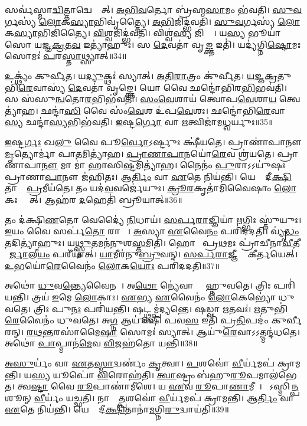 𑌸𑌰𑍍𑌵॑𑌸𑍍𑌮𑌾\ul{𑌦𑍍𑌵𑌿}𑌤𑍍𑌤𑌾𑌦𑍍𑌵𑍇𑌦𑍍𑌯𑌾᳚𑌤𑍍।
\ul{𑌅}\ul{𑌭𑌿}\ul{𑌵}𑌰𑍍𑌤𑍋 𑌬𑍍𑌰॑𑌹𑍍𑌮\ul{𑌸𑌾}𑌮𑌂 𑌭॑𑌵𑌤𑌿।
\ul{𑌸𑍁}\ul{𑌵}𑌰𑍍𑌗𑌸𑍍𑌯॑ \ul{𑌲𑍋}𑌕\ul{𑌸𑍍𑌯𑌾}𑌭𑌿𑌵𑍃॑𑌤𑍍𑌤𑍍𑌯𑍈।
\ul{𑌅}\ul{𑌭𑌿}𑌜𑌿𑌦𑍍𑌭॑𑌵𑌤𑌿।
\ul{𑌸𑍁}\ul{𑌵}𑌰𑍍𑌗𑌸𑍍𑌯॑ \ul{𑌲𑍋}𑌕\ul{𑌸𑍍𑌯𑌾}𑌭𑌿𑌜𑌿॑𑌤𑍍𑌯𑍈।
\ul{𑌵𑌿}\ul{𑌶𑍍𑌵}𑌜𑌿𑌦𑍍𑌭॑𑌵𑌤𑌿।
𑌵𑌿𑌶𑍍𑌵॑\ul{𑌸𑍍𑌯} 𑌜𑌿𑌤𑍍𑌯𑍈᳚।
𑌯\ul{𑌸𑍍𑌯} 𑌭𑍂𑌯𑌾॑𑌸𑍋 𑌯𑌜𑍍𑌞\ul{𑌕𑍍𑌰}𑌤\ul{𑌵} 𑌇𑌤𑍍𑌯𑌾॑𑌹𑍁𑌃।
𑌸 \ul{𑌦𑍇}𑌵𑌤𑌾॑ 𑌵𑍃\ul{𑌙𑍍𑌕𑍍𑌤} 𑌇𑌤𑌿॑।
𑌯𑌦𑍍𑌯॑𑌗𑍍𑌨𑌿\ul{𑌷𑍍𑌟𑍋}𑌮𑌃 𑌸𑍋𑌮𑌃॑ \ul{𑌪}𑌰\ul{𑌸𑍍𑌤𑌾}𑌥𑍍𑌸𑍍𑌯𑌾𑌤𑍍॥34॥

\ul{𑌉}𑌕𑍍𑌥𑍍𑌯𑌂॑ 𑌕𑍁𑌰𑍍𑌵𑍀𑌤।
𑌯\ul{𑌦𑍍𑌯𑍁}𑌕𑍍𑌥𑌃॑ 𑌸𑍍𑌯𑌾𑌤𑍍।
\ul{𑌅}\ul{𑌤𑌿}\ul{𑌰𑌾}𑌤𑍍𑌰𑌂 𑌕𑍁॑𑌰𑍍𑌵𑍀𑌤।
\ul{𑌯}\ul{𑌜𑍍𑌞}\ul{𑌕𑍍𑌰}𑌤𑍁𑌭𑌿॑\ul{𑌰𑍇}𑌵𑌾𑌸𑍍𑌯॑ \ul{𑌦𑍇}𑌵𑌤𑌾॑ 𑌵𑍃𑌙𑍍𑌕𑍍𑌤𑍇।
𑌯𑍋 𑌵𑍈 𑌛𑌨𑍍𑌦𑍋॑𑌭𑌿𑌰\ul{𑌭𑌿}𑌭𑌵॑𑌤𑌿।
𑌸 𑌸॑𑌸𑍁\ul{𑌨𑍍𑌵}𑌤𑍋\ul{𑌰}𑌭𑌿𑌭॑𑌵𑌤𑌿।
\ul{𑌸𑌂}\ul{𑌵𑍇}𑌶𑌾𑌯॑ 𑌤𑍍𑌵𑍋𑌪\ul{𑌵𑍇}𑌶𑌾\ul{𑌯} 𑌤𑍍𑌵𑍇𑌤𑍍𑌯𑌾॑𑌹।
𑌛𑌨𑍍𑌦𑌾॑\ul{𑌸𑌿} 𑌵𑍈 𑌸𑌂॑\ul{𑌵𑍇}𑌶 𑌉॑𑌪\ul{𑌵𑍇}𑌶𑌃।
𑌛𑌨𑍍𑌦𑍋॑𑌭𑌿\ul{𑌰𑍇}𑌵𑌾\ul{𑌸𑍍𑌯} 𑌛𑌨𑍍𑌦𑌾॑\ul{𑌸𑍍𑌯}𑌭𑌿𑌭॑𑌵𑌤𑌿।
\ul{𑌇}𑌷𑍍𑌟\ul{𑌰𑍍𑌗𑍋} 𑌵𑌾 \ul{𑌋}𑌤𑍍𑌵𑌿𑌜𑌾॑𑌮\ul{𑌧𑍍𑌵}𑌰𑍍𑌯𑍁𑌃॥35॥

\ul{𑌇}𑌷𑍍𑌟\ul{𑌰𑍍𑌗𑌃} 𑌖\ul{𑌲𑍁} 𑌵𑍈 𑌪𑍂\ul{𑌰𑍍𑌵𑍋}\-𑌽𑌰𑍍𑌷𑍍𑌟𑍁𑌃 𑌕𑍍𑌷𑍀॑𑌯𑌤𑍇।
𑌪𑍍𑌰𑌾𑌣𑌾॑𑌪𑌾𑌨𑍗 \ul{𑌮𑍃}𑌤𑍍𑌯𑍋𑌰𑍍𑌮𑌾॑ 𑌪𑌾\ul{𑌤}𑌮𑌿𑌤𑍍𑌯𑌾॑𑌹।
\ul{𑌪𑍍𑌰𑌾}\ul{𑌣𑌾}\ul{𑌪𑌾}𑌨𑌯𑍋॑\ul{𑌰𑍇}𑌵 𑌶𑍍𑌰॑𑌯𑌤𑍇।
𑌪𑍍𑌰𑌾𑌣𑌾॑𑌪𑌾\ul{𑌨𑍗} 𑌮𑌾 𑌮𑌾॑ 𑌹𑌾𑌸𑌿\ul{𑌷𑍍𑌟}𑌮𑌿𑌤𑍍𑌯𑌾॑𑌹।
𑌨𑍈𑌨𑌂॑ \ul{𑌪𑍁}𑌰𑌾\-𑌽𑌽𑌯𑍁॑𑌷𑌃 𑌪𑍍𑌰𑌾𑌣𑌾\ul{𑌪𑌾}𑌨𑍗 𑌜॑𑌹𑌿𑌤𑌃।
𑌆\ul{𑌰𑍍𑌤𑌿𑌂} 𑌵𑌾 \ul{𑌏}𑌤𑍇 𑌨𑌿𑌯॑𑌨𑍍𑌤𑌿।
𑌯𑍇𑌷𑌾𑌂᳚ 𑌦𑍀\ul{𑌕𑍍𑌷𑌿}𑌤𑌾𑌨𑌾𑌂᳚ \ul{𑌪𑍍𑌰}𑌮𑍀𑌯॑𑌤𑍇।
𑌤𑌂 𑌯𑌦॑\ul{𑌵}𑌵𑌰𑍍𑌜𑍇॑𑌯𑍁𑌃।
\ul{𑌕𑍍𑌰𑍂}\ul{𑌰}𑌕𑍃𑌤𑌾॑𑌮𑌿𑌵𑍈𑌷𑌾𑌂 \ul{𑌲𑍋}𑌕𑌃 𑌸𑍍𑌯𑌾᳚𑌤𑍍।
𑌆𑌹॑𑌰 \ul{𑌦}𑌹𑍇𑌤𑌿॑ 𑌬𑍍𑌰𑍂𑌯𑌾𑌤𑍍॥36॥

𑌤𑌂 𑌦॑𑌕𑍍𑌷𑌿\ul{𑌣}𑌤𑍋 𑌵𑍇𑌦𑍍𑌯𑍈॑ \ul{𑌨𑌿}𑌧𑌾𑌯॑।
\ul{𑌸}\ul{𑌰𑍍𑌪}\ul{𑌰𑌾}𑌜𑍍𑌞𑌿𑌯𑌾॑ \ul{𑌋}𑌗𑍍𑌭𑌿𑌃 𑌸𑍍𑌤𑍁॑𑌯𑍁𑌃।
\ul{𑌇}𑌯𑌂 𑌵𑍈 𑌸𑌰𑍍𑌪॑\ul{𑌤𑍋} 𑌰𑌾𑌜𑍍𑌞𑍀᳚।
\ul{𑌅}𑌸𑍍𑌯𑌾 \ul{𑌏}𑌵𑍈\ul{𑌨𑌂} 𑌪𑌰𑌿॑𑌦𑌦𑌤𑌿।
𑌵𑍍𑌯𑍃॑\ul{𑌦𑍍𑌧𑌂} 𑌤𑌦𑌿𑌤𑍍𑌯𑌾॑𑌹𑍁𑌃।
𑌯\ul{𑌥𑍍𑌸𑍍𑌤𑍁}𑌤𑌮𑌨॑𑌨𑍁𑌶\ul{𑌸𑍍𑌤}𑌮𑌿𑌤𑌿॑।
𑌹𑍋𑌤𑌾᳚ 𑌪𑍍𑌰\ul{𑌥}𑌮𑌃 𑌪𑍍𑌰𑌾॑𑌚𑍀𑌨𑌾\ul{𑌵𑍀}𑌤𑍀 𑌮𑌾᳚\ul{𑌰𑍍𑌜𑌾}𑌲𑍀\ul{𑌯𑌂} 𑌪𑌰𑍀॑𑌯𑌾𑌤𑍍।
\ul{𑌯𑌾}𑌮𑍀𑌰॑𑌨𑍁\ul{𑌬𑍍𑌰𑍁}𑌵𑌨𑍍।
\ul{𑌸}\ul{𑌰𑍍𑌪}\ul{𑌰𑌾}𑌜𑍍𑌞𑍀𑌨𑌾𑌂᳚ 𑌕𑍀𑌰𑍍𑌤𑌯𑍇𑌤𑍍।
\ul{𑌉}𑌭𑌯𑍋॑\ul{𑌰𑍇}𑌵𑍈𑌨𑌂॑ \ul{𑌲𑍋}𑌕\ul{𑌯𑍋𑌃} 𑌪𑌰𑌿॑𑌦𑌦𑌤𑌿॥37॥

𑌅𑌥𑍋॑ \ul{𑌧𑍁}𑌵\ul{𑌨𑍍𑌤𑍍𑌯𑍇}𑌵𑍈𑌨𑌮𑍍᳚।
𑌅\ul{𑌥𑍋} 𑌨𑍍𑌯𑍇॑𑌵𑌾𑌸𑍍𑌮𑍈᳚ 𑌹𑍍𑌨𑍁𑌵𑌤𑍇।
𑌤𑍍𑌰𑌿𑌃 𑌪𑌰𑌿॑𑌯𑌨𑍍𑌤𑌿।
𑌤𑍍𑌰𑌯॑ \ul{𑌇}𑌮𑍇 \ul{𑌲𑍋}𑌕𑌾𑌃।
\ul{𑌏}𑌭𑍍𑌯 \ul{𑌏}𑌵𑍈𑌨𑌂॑ \ul{𑌲𑍋}𑌕𑍇𑌭𑍍𑌯𑍋॑ 𑌧𑍁𑌵𑌤𑍇।
𑌤𑍍𑌰𑌿𑌃 𑌪𑍁\ul{𑌨𑌃} 𑌪𑌰𑌿॑𑌯𑌨𑍍𑌤𑌿।
𑌷𑌟𑍍𑌥𑍍𑌸𑌮𑍍𑌪॑𑌦𑍍𑌯𑌨𑍍𑌤𑍇।
𑌷𑌡𑍍𑌵𑌾 \ul{𑌋}𑌤𑌵𑌃॑।
\ul{𑌋}𑌤𑍁𑌭𑌿॑\ul{𑌰𑍇}𑌵𑍈𑌨𑌂॑ 𑌧𑍁𑌵𑌤𑍇।
𑌅\ul{𑌗𑍍𑌨} 𑌆𑌯𑍂॑𑌷𑌿 𑌪𑌵\ul{𑌸} 𑌇𑌤𑌿॑ 𑌪𑍍𑌰\ul{𑌤𑌿}𑌪𑌦𑌂॑ 𑌕𑍁𑌰𑍍𑌵𑍀𑌰𑌨𑍍।
\ul{𑌰}\ul{𑌥}\ul{𑌨𑍍𑌤}𑌰𑌸𑌾॑𑌮𑍈\ul{𑌷𑌾}\ul{} 𑌸𑍋𑌮𑌃॑ 𑌸𑍍𑌯𑌾𑌤𑍍।
𑌆𑌯𑍁॑\ul{𑌰𑍇}𑌵𑌾𑌽𑌽𑌤𑍍𑌮𑌨𑍍𑌦॑𑌧𑌤𑍇।
𑌅𑌥𑍋॑ \ul{𑌪𑌾}𑌪𑍍𑌮𑌾𑌨॑\ul{𑌮𑍇}𑌵 \ul{𑌵𑌿}𑌜𑌹॑𑌤𑍋 𑌯𑌨𑍍𑌤𑌿॥38॥

\ul{𑌅}\ul{𑌸𑍁}𑌰𑍍𑌯𑌂॑ 𑌵𑌾 \ul{𑌏}𑌤\ul{𑌸𑍍𑌮𑌾}𑌦𑍍𑌵𑌰𑍍𑌣𑌂॑ \ul{𑌕𑍃}𑌤𑍍𑌵𑌾।
\ul{𑌪}𑌶𑌵𑍋॑ \ul{𑌵𑍀}𑌰𑍍𑌯॑𑌮𑌪॑ 𑌕𑍍𑌰𑌾𑌮𑌨𑍍𑌤𑌿।
𑌯\ul{𑌸𑍍𑌯} 𑌯𑍂𑌪𑍋॑ \ul{𑌵𑌿}𑌰𑍋𑌹॑𑌤𑌿।
\ul{𑌤𑍍𑌵𑌾}𑌷𑍍𑌟𑍍𑌰𑌂 𑌬॑𑌹𑍁\ul{𑌰𑍂}𑌪𑌮𑌾𑌲॑𑌭𑍇𑌤।
𑌤𑍍𑌵\ul{𑌷𑍍𑌟𑌾} 𑌵𑍈 \ul{𑌰𑍂}𑌪𑌾𑌣𑌾॑𑌮𑍀𑌶𑍇।
𑌯 \ul{𑌏}𑌵 \ul{𑌰𑍂}𑌪𑌾\ul{𑌣𑌾}𑌮𑍀𑌶𑍇᳚।
𑌸𑍋᳚𑌽𑌸𑍍𑌮𑌿\ul{𑌨𑍍𑌪}𑌶𑍂𑌨𑍍 \ul{𑌵𑍀}𑌰𑍍𑌯𑌂॑ 𑌯𑌚𑍍𑌛𑌤𑌿।
𑌨𑌾𑌸𑍍𑌮𑌾᳚\ul{𑌤𑍍𑌪}𑌶𑌵𑍋॑ \ul{𑌵𑍀}𑌰𑍍𑌯॑𑌮𑌪॑ 𑌕𑍍𑌰𑌾𑌮𑌨𑍍𑌤𑌿।
𑌆\ul{𑌰𑍍𑌤𑌿𑌂} 𑌵𑌾 \ul{𑌏}𑌤𑍇 𑌨𑌿𑌯॑𑌨𑍍𑌤𑌿।
𑌯𑍇𑌷𑌾𑌂᳚ 𑌦𑍀\ul{𑌕𑍍𑌷𑌿}𑌤𑌾𑌨𑌾॑\ul{𑌮}𑌗𑍍𑌨𑌿\ul{𑌰𑍁}𑌦𑍍𑌵𑌾𑌯॑𑌤𑌿॥39॥

